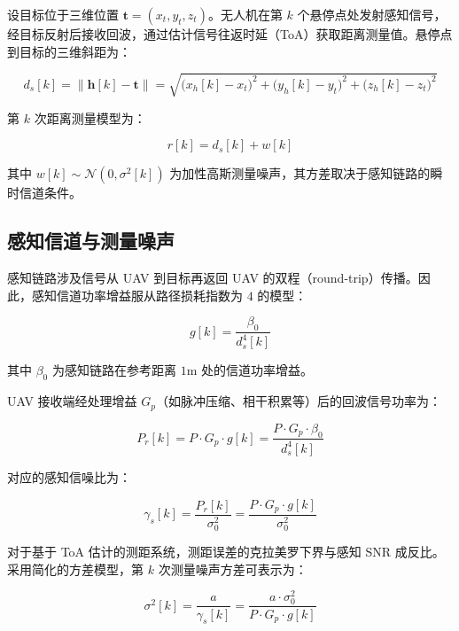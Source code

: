设目标位于三维位置 $\mathbf{t}=(x_t, y_t, z_t)$。无人机在第 $k$ 个悬停点处发射感知信号，经目标反射后接收回波，通过估计信号往返时延（ToA）获取距离测量值。悬停点到目标的三维斜距为：

\begin{equation}
d_s[k]=\|\mathbf{h}[k]-\mathbf{t}\|=\sqrt{\bigl(x_h[k]-x_t\bigr)^2+\bigl(y_h[k]-y_t\bigr)^2+\bigl(z_h[k]-z_t\bigr)^2}
\label{eq:ds_distance}
\end{equation}

第 $k$ 次距离测量模型为：

\begin{equation}
r[k]=d_s[k]+w[k]
\label{eq:measurement_model}
\end{equation}

其中 $w[k]\sim\mathcal{N}(0,\sigma^2[k])$ 为加性高斯测量噪声，其方差取决于感知链路的瞬时信道条件。

\subsection{感知信道与测量噪声}

感知链路涉及信号从 UAV 到目标再返回 UAV 的双程（round-trip）传播。因此，感知信道功率增益服从路径损耗指数为 $4$ 的模型：

\begin{equation}
g[k]=\frac{\beta_0}{d_s^4[k]}
\label{eq:channel_gain_sensing}
\end{equation}

其中 $\beta_0$ 为感知链路在参考距离 $1\text{m}$ 处的信道功率增益。

UAV 接收端经处理增益 $G_p$（如脉冲压缩、相干积累等）后的回波信号功率为：

\begin{equation}
P_r[k]=P\cdot G_p\cdot g[k]=\frac{P\cdot G_p\cdot\beta_0}{d_s^4[k]}
\label{eq:received_power}
\end{equation}

对应的感知信噪比为：

\begin{equation}
\gamma_s[k]=\frac{P_r[k]}{\sigma_0^2}=\frac{P\cdot G_p\cdot g[k]}{\sigma_0^2}
\label{eq:sensing_snr}
\end{equation}

对于基于 ToA 估计的测距系统，测距误差的克拉美罗下界与感知 SNR 成反比。采用简化的方差模型，第 $k$ 次测量噪声方差可表示为\cite{Rangzenegger2020}：

\begin{equation}
\sigma^2[k]=\frac{a}{\gamma_s[k]}=\frac{a\cdot\sigma_0^2}{P\cdot G_p\cdot g[k]}
\label{eq:measurement_variance}
\end{equation}

